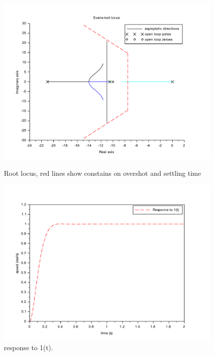 \documentclass[a4paper,12pt,oneside]{article}
\begin{document}
\begin{figure}
	\centering
	\includegraphics[width=\columnwidth]{../controler/root_locus}
	\caption{Root locus, red lines show constains on overshot and settling time}
	\label{fig:root_locus}
	\centering
	\includegraphics[width=\columnwidth]{../controler/response}
	\caption{response to 1(t).}
	\label{fig:response}
\end{figure}
\end{document}

